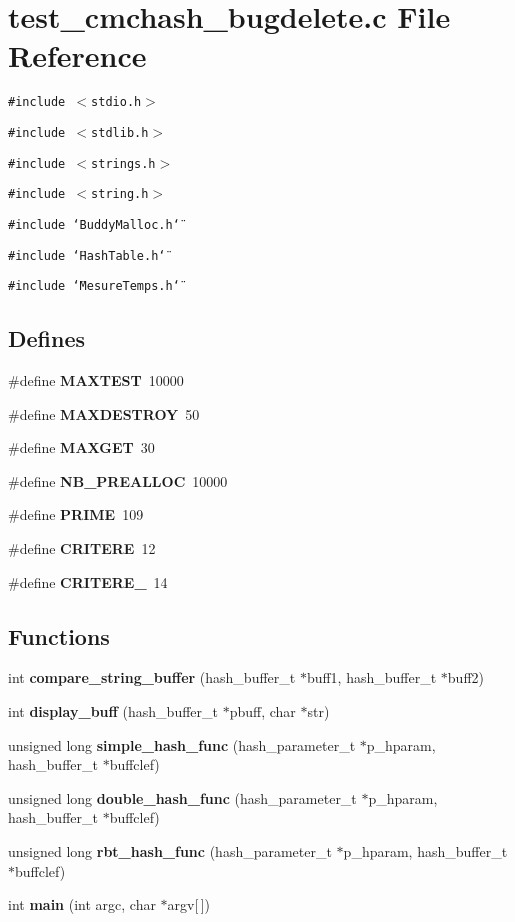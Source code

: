 \section{test\_\-cmchash\_\-bugdelete.c File Reference}
\label{test__cmchash__bugdelete_8c}
{\tt \#include $<$stdio.h$>$}\par
{\tt \#include $<$stdlib.h$>$}\par
{\tt \#include $<$strings.h$>$}\par
{\tt \#include $<$string.h$>$}\par
{\tt \#include \char`\"{}BuddyMalloc.h\char`\"{}}\par
{\tt \#include \char`\"{}HashTable.h\char`\"{}}\par
{\tt \#include \char`\"{}MesureTemps.h\char`\"{}}\par
\subsection*{Defines}
\begin{CompactItemize}
\item 
\#define {\bf MAXTEST}~10000
\item 
\#define {\bf MAXDESTROY}~50
\item 
\#define {\bf MAXGET}~30
\item 
\#define {\bf NB\_\-PREALLOC}~10000
\item 
\#define {\bf PRIME}~109
\item 
\#define {\bf CRITERE}~12
\item 
\#define {\bf CRITERE\_}~14
\end{CompactItemize}
\subsection*{Functions}
\begin{CompactItemize}
\item 
int {\bf compare\_\-string\_\-buffer} (hash\_\-buffer\_\-t $\ast$buff1, hash\_\-buffer\_\-t $\ast$buff2)
\item 
int {\bf display\_\-buff} (hash\_\-buffer\_\-t $\ast$pbuff, char $\ast$str)
\item 
unsigned long {\bf simple\_\-hash\_\-func} (hash\_\-parameter\_\-t $\ast$p\_\-hparam, hash\_\-buffer\_\-t $\ast$buffclef)
\item 
unsigned long {\bf double\_\-hash\_\-func} (hash\_\-parameter\_\-t $\ast$p\_\-hparam, hash\_\-buffer\_\-t $\ast$buffclef)
\item 
unsigned long {\bf rbt\_\-hash\_\-func} (hash\_\-parameter\_\-t $\ast$p\_\-hparam, hash\_\-buffer\_\-t $\ast$buffclef)
\item 
int {\bf main} (int argc, char $\ast$argv[$\,$])
\end{CompactItemize}
